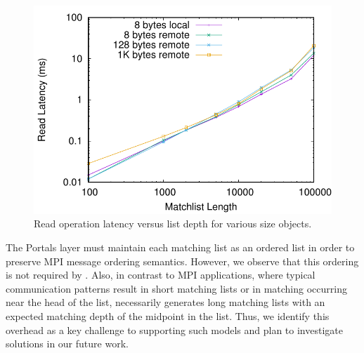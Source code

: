 \begin{figure}
    \centering
    \includegraphics[width=\linewidth]{plots/mlen}
    \caption{Read operation latency versus list depth for various size objects.}
    \label{fig:mlen}
\end{figure}

The Portals layer must maintain each matching list as an ordered list in order
to preserve MPI message ordering semantics.  However, we observe that this
ordering is not required by \pdht.  Also, in contrast to MPI applications,
where typical communication patterns result in short matching lists or in
matching occurring near the head of the list, \pdht necessarily generates long
matching lists with an expected matching depth of the midpoint in the list.
Thus, we identify this overhead as a key challenge to supporting such models
and plan to investigate solutions in our future work.

